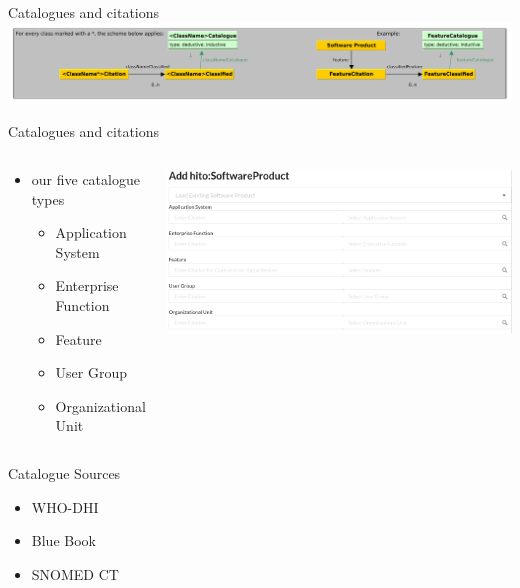 \documentclass[aspectratio=1610,12pt]{beamer}
\newcommand{\enquote}[1]{{\glqq#1\grqq{}}}
\begin{document}
\begin{frame}{Catalogues and citations}
\pause
\centering
\includegraphics[width=\textwidth]{img/excerpt1.pdf}
\end{frame}

\begin{frame}{Catalogues and citations}
\begin{columns}
  \vspace{-1cm}
  \begin{spacing}{1.25}
    \begin{itemize}
      \item our five catalogue types
      \begin{itemize}
        \item Application System
        \item Enterprise Function
        \item Feature
        \item User Group
        \item Organizational Unit
      \end{itemize}
    \end{itemize}
  \end{spacing}
  \centering
  \includegraphics[width=\textwidth]{img/iglook.png}
\end{columns}
\end{frame}

\begin{frame}{Catalogue Sources}
  \begin{itemize}
    \item WHO-DHI
    \item \enquote{Blue Book}
    \item SNOMED CT
  \end{itemize}
\end{frame}
\end{document}
